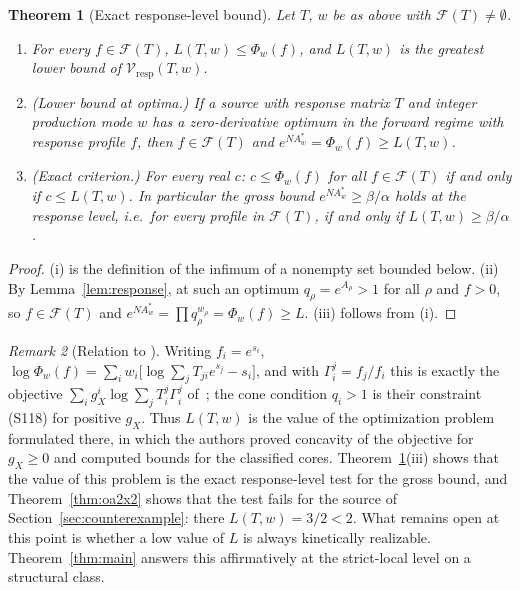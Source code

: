\documentclass[11pt,reqno]{amsart}
\theoremstyle{plain}
\newtheorem{theorem}{Theorem}[section]
\theoremstyle{definition}
\theoremstyle{remark}
\newtheorem{remark}[theorem]{Remark}
\numberwithin{equation}{section}
\newcommand{\cone}{\mathcal{F}}
\newcommand{\Vresp}{\mathcal{V}_{\mathrm{resp}}}
\begin{document}
\begin{theorem}[Exact response-level bound]\label{thm:capacity}
Let $T$, $w$ be as above with $\cone(T)\neq\emptyset$.
\begin{enumerate}[label=(\roman*)]
\item For every $f\in\cone(T)$, $L(T,w)\le\Phi_w(f)$, and $L(T,w)$ is the greatest lower bound of $\Vresp(T,w)$.
\item (Lower bound at optima.)  If a source with response matrix $T$ and integer production mode $w$ has a zero-derivative optimum in the forward regime with response profile $f$, then $f\in\cone(T)$ and $e^{NA^*_w}=\Phi_w(f)\ge L(T,w)$.
\item (Exact criterion.)  For every real $c$: $c\le\Phi_w(f)$ for all $f\in\cone(T)$ if and only if $c\le L(T,w)$.  In particular the gross bound $e^{NA^*_w}\ge\beta/\alpha$ holds at the response level, i.e.\ for every profile in $\cone(T)$, if and only if $L(T,w)\ge\beta/\alpha$.
\end{enumerate}
\end{theorem}

\begin{proof}
(i) is the definition of the infimum of a nonempty set bounded below.  (ii) By Lemma~\ref{lem:response}, at such an optimum $q_\rho=e^{A_\rho}>1$ for all $\rho$ and $f>0$, so $f\in\cone(T)$ and $e^{NA^*_w}=\prod q_\rho^{w_\rho}=\Phi_w(f)\ge L$.  (iii) follows from (i).
\end{proof}

\begin{remark}[Relation to {\cite{DDL24}}]\label{rem:ddl-opt}
Writing $f_i=e^{s_i}$, $\log\Phi_w(f)=\sum_iw_i\big[\log\sum_jT_{ji}e^{s_j}-s_i\big]$, and with $\Gamma^j_i=f_j/f_i$ this is exactly the objective $\sum_ig_X^i\log\sum_jT_i^j\Gamma^j_i$ of~\cite[Eq.~(S117)]{DDL24}; the cone condition $q_i>1$ is their constraint (S118) for positive $g_X$.  Thus $L(T,w)$ is the value of the optimization problem formulated there, in which the authors proved concavity of the objective for $g_X\ge0$ and computed bounds for the classified cores.  Theorem~\ref{thm:capacity}(iii) shows that the value of this problem is the exact response-level test for the gross bound, and Theorem~\ref{thm:oa2x2} shows that the test fails for the source of Section~\ref{sec:counterexample}: there $L(T,w)=3/2<2$.  What remains open at this point is whether a low value of $L$ is always kinetically realizable.  Theorem~\ref{thm:main} answers this affirmatively at the strict-local level on a structural class.
\end{remark}
\end{document}
